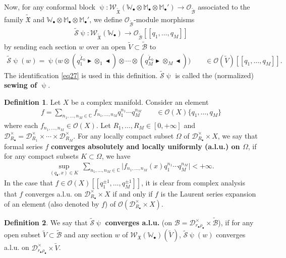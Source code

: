 \documentclass[12pt,a4paper,notitlepage]{article}
\theoremstyle{definition}
\newtheorem{df}{Definition}[section]
\theoremstyle{plain}
\newcommand{\fk}{\mathfrak}
\newcommand{\mc}{\mathcal}
\newcommand{\wtd}{\widetilde}
\newcommand{\scr}{\mathscr}
\newcommand{\blt}{\bullet}
\newcommand{\Wbb}{\mathbb W}
\newcommand{\Mbb}{\mathbb M}
\newcommand{\Cbb}{\mathbb C}
\newcommand{\btl}{\blacktriangleleft}
\newcommand{\btr}{\blacktriangleright}
\numberwithin{equation}{section}
\begin{document}
Now, for any conformal block $\uppsi:\scr W_{\wtd{\fk X}}(\Wbb_\blt\otimes\Mbb_\blt\otimes\Mbb_\blt')\rightarrow\scr O_{\wtd{\mc B}}$ associated to the family $\wtd{\fk X}$ and $\Wbb_\blt\otimes\Mbb_\blt\otimes\Mbb_\blt'$, we define $\scr O_{\wtd{\mc B}}$-module morphisms \index{S@$\wtd{\mc S}\uppsi$}
\begin{gather*}
\wtd{\mc S}\uppsi:\scr W_{\wtd{\fk X}}(\Wbb_\blt)\rightarrow\scr O_{\wtd{\mc B}}[[q_1,\dots,q_M]]
\end{gather*}
by sending each section $w$ over an open $\wtd V\subset\wtd{\mc B}$ to 
\begin{align}
\wtd{\mc S}\uppsi(w)=\uppsi\Big(w\otimes (q_1^{\wtd  L_0}\btr\otimes_1\btl)\otimes\cdots\otimes (q_M^{\wtd  L_0}\btr\otimes_M\btl)\Big)\qquad\in\scr O(\wtd V)[[q_1,\dots,q_M]].
\end{align}
The identification \eqref{eq27} is used in this definition. $\wtd{\mc S}\uppsi$ is called the (normalized) \textbf{sewing of $\uppsi$}.





	
\begin{df}\label{lb19}
Let $X$ be a complex manifold. Consider an element
\begin{align*}
f=\sum_{n_1,\dots,n_M\in\Cbb} f_{n_1,\dots,n_M}q_1^{n_1}\cdots q_M^{n_M}	\qquad\in\scr O(X)\{q_1,\dots,q_M\}
\end{align*}
where each $f_{n_1,\dots,n_M}\in\scr O(X)$. Let $R_1,\dots,R_M\in[0,+\infty]$ and $\mc D_{R_\blt}^\times=\mc D_{R_1}^\times\times\cdots\times\mc D_{R_M}^\times$. For any locally compact subset $\Omega$ of $\mc D_{R_\blt}^\times\times X$, we say that formal series $f$ \textbf{converges absolutely and locally uniformly (a.l.u.)  on $\Omega$}, if for any compact subsets $K\subset\Omega$, we have
\begin{align*}
\sup_{(q_\blt,x)\in K}~\sum_{n_1,\dots,n_M\in\Cbb} \big|f_{n_1,\dots,n_M}(x)q_1^{n_1}\cdots q_M^{n_M}	\big| <+\infty.
\end{align*}  
In the case that $f\in\scr O(X)[[q_1^{\pm 1},\dots,q_M^{\pm 1}]]$, it is clear from complex analysis that $f$ converges a.l.u. on $\mc D_{R_\blt}^\times\times X$ if and only if $f$ is the Laurent series expansion of an element (also denoted by $f$) of $\scr O(\mc D_{R_\blt}^\times\times X)$.
\end{df}

\begin{df}
We say that $\wtd{\mc S}\uppsi$ \textbf{converges a.l.u.} (on $\mc B=\mc D_{r_\blt\rho_\blt}^\times\times\wtd{\mc B}$), if for any open subset $\wtd V\subset\wtd{\mc B}$ and any section $w$ of $\scr W_{\fk X}(\Wbb_\blt)(\wtd V)$, $\wtd{\mc S}\uppsi(w)$  converges a.l.u. on $\mc D_{r_\blt\rho_\blt}^\times\times\wtd V$.
\end{df}
\end{document}

